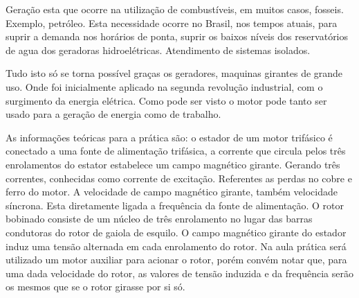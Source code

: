 \documentclass[paper=a4, fontsize=11pt]{article}
\begin{document}
Geração esta que ocorre na utilização de combustíveis, 
em muitos casos, fosseis. Exemplo, petróleo. Esta 
necessidade ocorre no Brasil, nos tempos atuais, para
suprir a demanda nos horários de ponta, suprir
os baixos níveis dos reservatórios de agua dos 
geradoras hidroelétricas. Atendimento de sistemas
isolados. 

Tudo isto só se torna possível graças os geradores, 
maquinas girantes de grande uso. Onde foi inicialmente 
aplicado na segunda revolução industrial, com o surgimento
da energia elétrica. Como pode ser visto o motor
pode tanto ser usado para a geração de energia como de 
trabalho.

As informações teóricas para a prática são: o estador 
de um motor trifásico é conectado a uma fonte de alimentação
trifásica, a corrente que circula pelos três enrolamentos 
do estator estabelece um campo magnético girante. Gerando
três correntes, conhecidas como corrente de excitação. 
Referentes as perdas no cobre e ferro do motor. A velocidade
de campo magnético girante, também velocidade síncrona. Esta
diretamente ligada a frequência da fonte de alimentação. 
O rotor bobinado consiste de um núcleo de três enrolamento no
lugar das barras condutoras do rotor de gaiola de esquilo. O
campo magnético girante do estador induz uma tensão alternada
em cada enrolamento do rotor. Na aula prática será utilizado
um motor auxiliar para acionar o rotor, porém convém notar que, 
para uma dada velocidade do rotor, as valores de tensão 
induzida e da frequência serão os mesmos que se o rotor 
girasse por si só.
\end{document}

